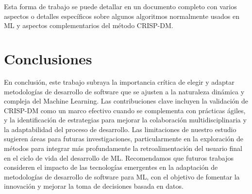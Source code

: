 \documentclass[journal]{IEEEtran}
\begin{document}
Esta forma de trabajo se puede detallar en un documento completo con varios aspectos o detalles específicos sobre algunos algoritmos normalmente usados en ML y aspectos complementarios del método CRISP-DM.\\

\section{Conclusiones}
En conclusión, este trabajo subraya la importancia crítica de elegir y adaptar metodologías de desarrollo de software que se ajusten a la naturaleza dinámica y compleja del Machine Learning. Las contribuciones clave incluyen la validación de CRISP-DM como un marco efectivo cuando se complementa con prácticas ágiles, y la identificación de estrategias para mejorar la colaboración multidisciplinaria y la adaptabilidad del proceso de desarrollo. Las limitaciones de nuestro estudio sugieren áreas para futuras investigaciones, particularmente en la exploración de métodos para integrar más profundamente la retroalimentación del usuario final en el ciclo de vida del desarrollo de ML. Recomendamos que futuros trabajos consideren el impacto de las tecnologías emergentes en la adaptación de metodologías de desarrollo de software para ML, con el objetivo de fomentar la innovación y mejorar la toma de decisiones basada en datos.




\end{document}
